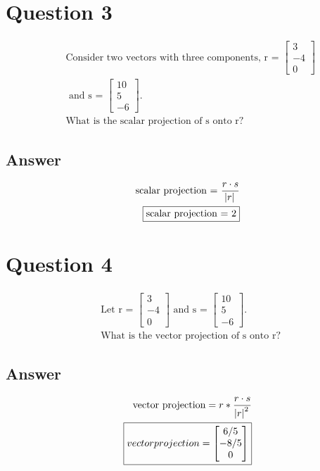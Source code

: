\documentclass[12pt]{article}
\begin{document}
\section*{Question 3}
    \begin{eqnarray*}
        & &\text{Consider two vectors with three components, r = }
        \begin{bmatrix}
            3 \\ -4 \\ 0
        \end{bmatrix} \\
        & &\text{ and s = }
        \begin{bmatrix}
            10 \\ 5 \\ -6
        \end{bmatrix}
        \text{.} \\
        & &\text{What is the scalar projection of s onto r?}
    \end{eqnarray*}

\subsection*{Answer}
    \begin{eqnarray*}
        & &\text{scalar projection = } \frac{r \cdot s}{\abs{r}} \\
        & &\fbox{scalar projection = 2}
    \end{eqnarray*}

\section*{Question 4}
    \begin{eqnarray*}
        & &\text{Let r = }
        \begin{bmatrix}
            3 \\ -4 \\ 0
        \end{bmatrix}
        \text{ and s = }
        \begin{bmatrix}
            10 \\ 5 \\ -6
        \end{bmatrix}
        \text{.} \\
        & &\text{What is the vector projection of s onto r?}
    \end{eqnarray*}

\subsection*{Answer}
    \begin{eqnarray*}
        & &\text{vector projection} = r * \frac{r \cdot s}{\abs{r}^2} \\
        & &\boxed{vector projection = 
        \begin{bmatrix}
            6/5 \\ -8/5 \\ 0
        \end{bmatrix}}
    \end{eqnarray*}
	
	

\end{document}
